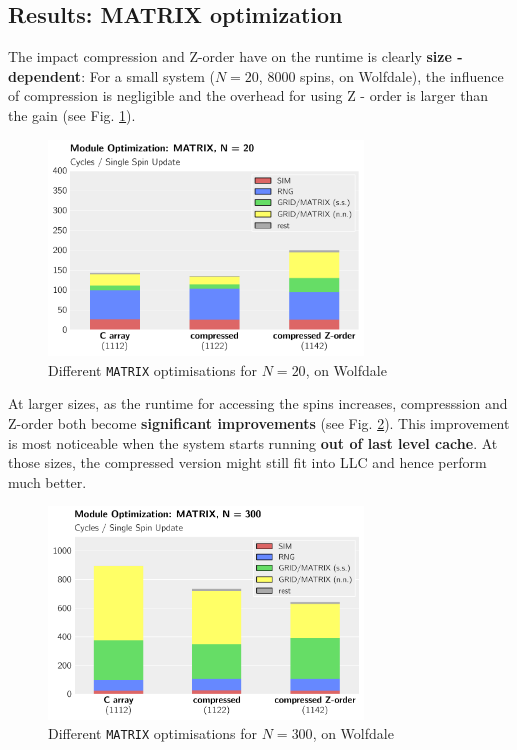 \documentclass[letterpaper]{article}
\begin{document}
\subsection{Results: MATRIX optimization}
The impact compression and Z-order have on the runtime is clearly \textbf{size - dependent}: For a small system ($N = 20$, $8000$ spins, on Wolfdale), the influence of compression is negligible and the overhead for using Z - order is larger than the gain (see Fig. \ref{MATRIX:Wolf:20}).
	\begin{figure}[h]\centering
	  \includegraphics[width = 8.36cm]{plots/msk_20_3.pdf}
	  \caption{Different \texttt{MATRIX} optimisations for $N = 20$, on Wolfdale}
	  \label{MATRIX:Wolf:20}
	\end{figure}\newline
At larger sizes, as the runtime for accessing the spins increases, compresssion and Z-order both become \textbf{significant improvements} (see Fig. \ref{MATRIX:Wolf:300}). This improvement is most noticeable when the system starts running \textbf{out of last level cache}. At those sizes, the compressed version might still fit into LLC and hence perform much better.
	\begin{figure}[h]\centering
	  \includegraphics[width = 8.36cm]{plots/msk_300_3.pdf}
	  \caption{Different \texttt{MATRIX} optimisations for $N = 300$, on Wolfdale}
	  \label{MATRIX:Wolf:300}
	\end{figure}\newline
\end{document}
